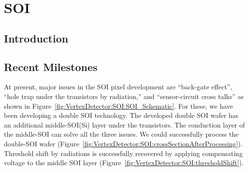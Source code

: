 \section{SOI}
\subsection{Introduction}
\subsection{Recent Milestones}
At present, major issues in the SOI pixel development are ``back-gate effect'', ``hole trap under the transistors by radiation,'' and ``sensor-circuit cross talks'' as shown in Figure~\ref{fig:VertexDetector:SOI:SOI_Schematic}. For these, we have been developing a double SOI technology. The developed double SOI wafer has an additional middle-SOI(Si) layer under the transistors. The conduction layer of the middle-SOI can solve all the three issues. We could successfully process the double-SOI wafer (Figure~\ref{fig:VertexDetector:SOI:crossSectionAfterProcessing}). Threshold shift by radiations is successfully recovered by applying compensating voltage to the middle SOI layer (Figure~\ref{fig:VertexDetector:SOI:thresholdShift}).


